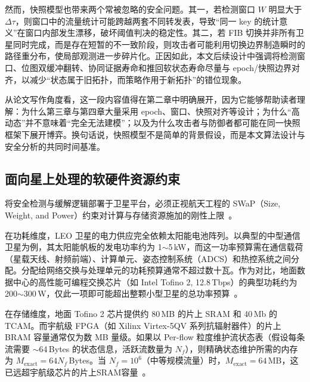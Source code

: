 然而，快照模型也带来两个常被忽略的安全问题。其一，若检测窗口 $W$ 明显大于 $\Delta\tau$，则窗口中的流量统计可能跨越两套不同转发表，导致“同一 key 的统计意义”在窗口内部发生漂移，破坏阈值判决的稳定性。其二，若 FIB 切换并非所有卫星同时完成，而是存在短暂的不一致阶段，则攻击者可能利用切换边界制造瞬时的路径重分布，使局部观测进一步碎片化。正因如此，本文后续设计中强调将检测窗口、位图双缓冲翻转、协同证据寿命和推回软状态寿命尽量与 epoch/快照边界对齐，以减少“状态属于旧拓扑，而策略作用于新拓扑”的错位现象。

从论文写作角度看，这一段内容值得在第二章中明确展开，因为它能够帮助读者理解：为什么第三章与第四章大量采用 epoch、窗口、快照对齐等设计；为什么“高动态”并不意味着“完全无法建模”；以及为什么攻击者与防御者都可能在同一快照框架下展开博弈。换句话说，快照模型不是简单的背景假设，而是本文算法设计与安全分析的共同时间基准。


\subsection{面向星上处理的软硬件资源约束}

将安全检测与缓解逻辑部署于卫星平台，必须正视航天工程的 SWaP（Size, Weight, and Power）约束对计算与存储资源施加的刚性上限~\cite{satshield, kodheli2021satellite}。

在功耗维度，LEO 卫星的电力供应完全依赖太阳能电池阵列。以典型的中型通信卫星为例，其太阳能帆板的发电功率约为 1$\sim$5\,kW，而这一功率预算需在通信载荷（星载天线、射频前端）、计算单元、姿态控制系统（ADCS）和热控系统之间分配。分配给网络交换与处理单元的功耗预算通常不超过数十瓦。作为对比，地面数据中心的高性能可编程交换芯片（如 Intel Tofino 2, 12.8\,Tbps）的典型功耗约为 200$\sim$300\,W，仅此一项即可能超出整颗小型卫星的总功率预算~\cite{p4_survey, kodheli2021satellite}。

在存储维度，地面 Tofino 2 芯片提供约 80\,MB 的片上 SRAM 和 40\,Mb 的 TCAM。而宇航级 FPGA（如 Xilinx Virtex-5QV 系列抗辐射器件）的片上 BRAM 容量通常仅为数 MB 量级。如果以 Per-flow 粒度维护流状态表（假设每条流需要 $\sim$64\,Bytes 的状态信息，活跃流数量为 $N_f$），则精确状态维护所需的内存为 $M_{\text{exact}} = 64 N_f$\,Bytes。当 $N_f = 10^6$（中等规模流量）时，$M_{\text{exact}} = 64$\,MB，这已远超宇航级芯片的片上SRAM容量~\cite{p4_survey, satshield}。

